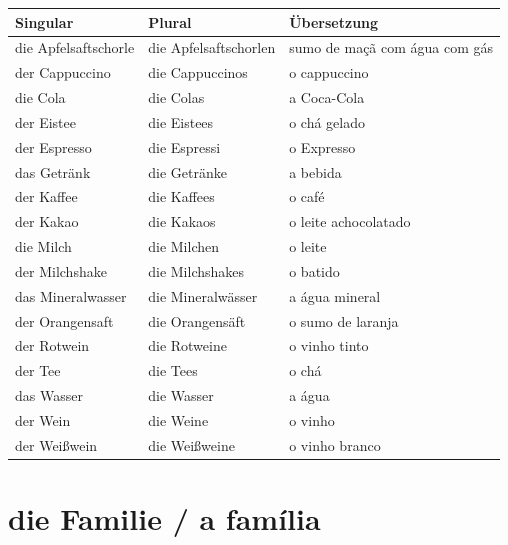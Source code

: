            \renewcommand{\baselinestretch}{1}
            \renewcommand{\arraystretch}{1.5}
            \begin{longtabu}to 
                \toprule
                \textbf{Singular} & \textbf{Plural} & \textbf{Übersetzung} \\ 
                \toprule \endhead
                    die Apfelsaftschorle & die Apfelsaftschorlen & sumo de maçã com água com gás\\ \hline
                    der Cappuccino & die Cappuccinos & o cappuccino\\ \hline
                    die Cola & die Colas & a Coca-Cola\\ \hline
                    der Eistee & die Eistees & o chá gelado\\ \hline  
                    der Espresso & die Espressi & o Expresso\\ \hline
                    das Getränk & die Getränke & a bebida\\ \hline
                    der Kaffee & die Kaffees & o café\\ \hline
                    der Kakao & die Kakaos & o leite achocolatado\\ \hline
                    die Milch & die Milchen & o leite\\ \hline
                    der Milchshake & die Milchshakes & o batido\\ \hline
                    das Mineralwasser & die Mineralwässer & a água mineral\\ \hline
                    der Orangensaft & die Orangensäft & o sumo de laranja\\ \hline
                    der Rotwein & die Rotweine & o vinho tinto\\ \hline
                    der Tee & die Tees & o chá\\ \hline
                    das Wasser & die Wasser & a água\\ \hline
                    der Wein & die Weine & o vinho\\ \hline
                    der Weißwein & die Weißweine & o vinho branco\\ \hline
                \toprule
            \end{longtabu}
            \renewcommand{\arraystretch}{1}
            \renewcommand{\baselinestretch}{1.5}

    \section{die Familie / a família}\label{section:deutsch:die_familie}
            
